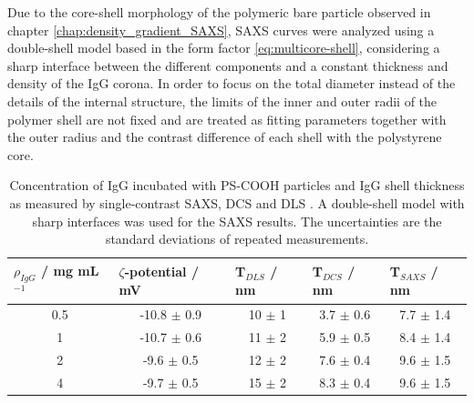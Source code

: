 Due to the core-shell morphology of the polymeric bare particle observed in chapter \ref{chap:density_gradient_SAXS}, SAXS curves were analyzed using a double-shell model based in the form factor \ref{eq:multicore-shell}, considering a sharp interface between the different components and a constant thickness and density of the IgG corona. In order to focus on the total diameter instead of the details of the internal structure, the limits of the inner and outer radii of the polymer shell are not fixed and are treated as fitting parameters together with the outer radius and the contrast difference of each shell with the polystyrene core.

\begin{table}[]
\centering
\caption[Concentration of IgG and IgG shell thickness around the PS-COOH particles.]{Concentration of IgG incubated with PS-COOH particles and IgG shell thickness as measured by single-contrast SAXS, DCS and DLS \citep{minelli_characterization_2014}. A double-shell model with sharp interfaces was used for the SAXS results. The uncertainties are the standard deviations of repeated measurements.}
\label{tab:CoatedKiskerSingleContrast}
\begin{tabular}{|c|c|c|c|c|}
\hline
\multicolumn{1}{|l|}{\textbf{$\rho_{IgG}$ / mg mL$^{-1}$ }} & \multicolumn{1}{l|}{\textbf{$\zeta$-potential / mV}} & \multicolumn{1}{l|}{\textbf{T$_{DLS}$ / nm}} & \multicolumn{1}{l|}{\textbf{T$_{DCS}$ / nm}} & \multicolumn{1}{l|}{\textbf{T$_{SAXS}$ / nm}} \\ \hline
0.5                     & -10.8 $\pm$ 0.9                  & 10 $\pm$ 1              & 3.7 $\pm$ 0.6                                & 7.7 $\pm$ 1.4                                 \\ \hline
1                        & -10.7 $\pm$ 0.6                  & 11 $\pm$ 2              & 5.9 $\pm$ 0.5                                & 8.4 $\pm$ 1.4                                 \\ \hline
2                         & -9.6 $\pm$ 0.5                   & 12 $\pm$ 2              & 7.6 $\pm$ 0.4                                & 9.6 $\pm$ 1.5                                 \\ \hline
4                        & -9.7 $\pm$ 0.5                   & 15 $\pm$ 2              & 8.3 $\pm$ 0.4                                & 9.6 $\pm$ 1.5                                 \\ \hline
\end{tabular}
\end{table}


